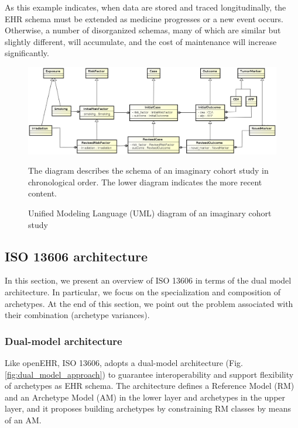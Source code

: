 \documentclass[preprint,3p,onecolumn,times,review]{article}
\begin{document}
As this example indicates, when data are stored and traced longitudinally, the EHR schema must be extended as medicine progresses or a new event occurs. Otherwise, a number of disorganized schemas, many of which are similar but slightly different, will accumulate, and the cost of maintenance will increase significantly.


\begin{figure}[!htbp]
  \begin{center}
    \includegraphics[width=16cm]{cancer_cohort_study_schema.eps}  
  \end{center}
  \caption{Unified Modeling Language (UML) diagram of an imaginary cohort study}\label{fig:cohort_study}
  {\footnotesize
    The diagram describes the schema of an imaginary cohort study in chronological order.
    The lower diagram indicates the more recent content.
    }
\end{figure}

\subsection{ISO 13606 architecture}

In this section, we present an overview of ISO 13606 in terms of the dual model architecture.
In particular, we focus on the specialization and composition of archetypes.
At the end of this section, we point out the problem associated with their combination (archetype variances).

\subsubsection{Dual-model architecture}


Like openEHR, ISO 13606, adopts a dual-model architecture (Fig. \ref{fig:dual_model_approach}) to guarantee interoperability and support flexibility of archetypes as EHR schema.
The architecture defines a Reference Model (RM) and an Archetype Model (AM) in the lower layer and archetypes in the upper layer, and it proposes building archetypes by constraining RM classes by means of an AM.
\end{document}
